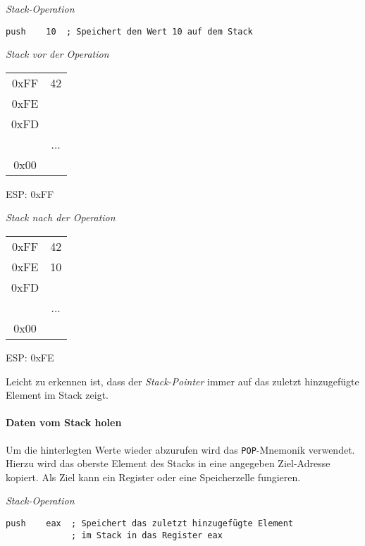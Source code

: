 
\textit{Stack-Operation}
\begin{lstlisting}
push    10  ; Speichert den Wert 10 auf dem Stack
\end{lstlisting}

\begin{multicols}{2}
\begin{minipage}{5cm}
\emph{Stack vor der Operation}\\
\begin{tabular}{c|c|}
    \cline{2-2}
   0xFF & 42\\ \cline{2-2}
   0xFE & \\ \cline{2-2}
   0xFD & \\ \cline{2-2}
          & ... \\ \cline{2-2}
     0x00 & \\ \cline{2-2}
\end{tabular}
ESP: 0xFF
\end{minipage}

\begin{minipage}{5cm}
\emph{Stack nach der Operation}\\
\begin{tabular}{c|c|}
    \cline{2-2}
   0xFF & 42\\ \cline{2-2}
   0xFE & 10\\ \cline{2-2}
   0xFD & \\ \cline{2-2}
          & ... \\ \cline{2-2}
     0x00 & \\ \cline{2-2}
\end{tabular}
ESP: 0xFE
\end{minipage}
\end{multicols}

Leicht zu erkennen ist, dass der \textit{Stack-Pointer} immer auf das zuletzt hinzugefügte Element im Stack zeigt.


\paragraph{Daten vom Stack holen\newline}
Um die hinterlegten Werte wieder abzurufen wird das \texttt{POP}-Mnemonik verwendet.
Hierzu wird das oberste Element des Stacks in eine angegeben Ziel-Adresse kopiert. Als Ziel kann ein Register oder eine Speicherzelle fungieren.

\textit{Stack-Operation}
\begin{lstlisting}
push    eax  ; Speichert das zuletzt hinzugefügte Element
             ; im Stack in das Register eax
\end{lstlisting}

